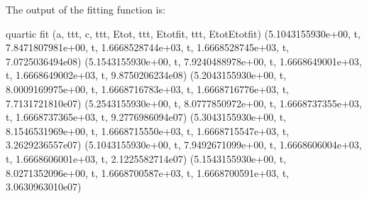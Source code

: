 \documentclass[letterpaper,10pt,english]{sphinxmanual}
\begin{document}
The output of the fitting function is:

\begin{sphinxVerbatim}[commandchars=\\\{\}]
quartic fit
(\PYGZsq{}a\PYGZsq{}, \PYGZsq{}\PYGZbs{}t\PYGZbs{}t\PYGZbs{}t\PYGZsq{}, \PYGZsq{}c\PYGZsq{}, \PYGZsq{}\PYGZbs{}t\PYGZbs{}t\PYGZbs{}t\PYGZsq{}, \PYGZsq{}Etot\PYGZsq{}, \PYGZsq{}\PYGZbs{}t\PYGZbs{}t\PYGZbs{}t\PYGZsq{}, \PYGZsq{}Etotfit\PYGZsq{}, \PYGZsq{}\PYGZbs{}t\PYGZbs{}t\PYGZbs{}t\PYGZsq{}, \PYGZsq{}Etot\PYGZhy{}Etotfit\PYGZsq{})
(\PYGZsq{}5.1043155930e+00\PYGZsq{}, \PYGZsq{}\PYGZbs{}t\PYGZsq{}, \PYGZsq{}7.8471807981e+00\PYGZsq{}, \PYGZsq{}\PYGZbs{}t\PYGZsq{}, \PYGZsq{}\PYGZhy{}1.6668528744e+03\PYGZsq{}, \PYGZsq{}\PYGZbs{}t\PYGZsq{}, \PYGZsq{}\PYGZhy{}1.6668528745e+03\PYGZsq{}, \PYGZsq{}\PYGZbs{}t\PYGZsq{}, \PYGZsq{}7.0725036494e\PYGZhy{}08\PYGZsq{})
(\PYGZsq{}5.1543155930e+00\PYGZsq{}, \PYGZsq{}\PYGZbs{}t\PYGZsq{}, \PYGZsq{}7.9240488978e+00\PYGZsq{}, \PYGZsq{}\PYGZbs{}t\PYGZsq{}, \PYGZsq{}\PYGZhy{}1.6668649001e+03\PYGZsq{}, \PYGZsq{}\PYGZbs{}t\PYGZsq{}, \PYGZsq{}\PYGZhy{}1.6668649002e+03\PYGZsq{}, \PYGZsq{}\PYGZbs{}t\PYGZsq{}, \PYGZsq{}9.8750206234e\PYGZhy{}08\PYGZsq{})
(\PYGZsq{}5.2043155930e+00\PYGZsq{}, \PYGZsq{}\PYGZbs{}t\PYGZsq{}, \PYGZsq{}8.0009169975e+00\PYGZsq{}, \PYGZsq{}\PYGZbs{}t\PYGZsq{}, \PYGZsq{}\PYGZhy{}1.6668716783e+03\PYGZsq{}, \PYGZsq{}\PYGZbs{}t\PYGZsq{}, \PYGZsq{}\PYGZhy{}1.6668716776e+03\PYGZsq{}, \PYGZsq{}\PYGZbs{}t\PYGZsq{}, \PYGZsq{}\PYGZhy{}7.7131721810e\PYGZhy{}07\PYGZsq{})
(\PYGZsq{}5.2543155930e+00\PYGZsq{}, \PYGZsq{}\PYGZbs{}t\PYGZsq{}, \PYGZsq{}8.0777850972e+00\PYGZsq{}, \PYGZsq{}\PYGZbs{}t\PYGZsq{}, \PYGZsq{}\PYGZhy{}1.6668737355e+03\PYGZsq{}, \PYGZsq{}\PYGZbs{}t\PYGZsq{}, \PYGZsq{}\PYGZhy{}1.6668737365e+03\PYGZsq{}, \PYGZsq{}\PYGZbs{}t\PYGZsq{}, \PYGZsq{}9.2776986094e\PYGZhy{}07\PYGZsq{})
(\PYGZsq{}5.3043155930e+00\PYGZsq{}, \PYGZsq{}\PYGZbs{}t\PYGZsq{}, \PYGZsq{}8.1546531969e+00\PYGZsq{}, \PYGZsq{}\PYGZbs{}t\PYGZsq{}, \PYGZsq{}\PYGZhy{}1.6668715550e+03\PYGZsq{}, \PYGZsq{}\PYGZbs{}t\PYGZsq{}, \PYGZsq{}\PYGZhy{}1.6668715547e+03\PYGZsq{}, \PYGZsq{}\PYGZbs{}t\PYGZsq{}, \PYGZsq{}\PYGZhy{}3.2629236557e\PYGZhy{}07\PYGZsq{})
(\PYGZsq{}5.1043155930e+00\PYGZsq{}, \PYGZsq{}\PYGZbs{}t\PYGZsq{}, \PYGZsq{}7.9492671099e+00\PYGZsq{}, \PYGZsq{}\PYGZbs{}t\PYGZsq{}, \PYGZsq{}\PYGZhy{}1.6668606004e+03\PYGZsq{}, \PYGZsq{}\PYGZbs{}t\PYGZsq{}, \PYGZsq{}\PYGZhy{}1.6668606001e+03\PYGZsq{}, \PYGZsq{}\PYGZbs{}t\PYGZsq{}, \PYGZsq{}\PYGZhy{}2.1225582714e\PYGZhy{}07\PYGZsq{})
(\PYGZsq{}5.1543155930e+00\PYGZsq{}, \PYGZsq{}\PYGZbs{}t\PYGZsq{}, \PYGZsq{}8.0271352096e+00\PYGZsq{}, \PYGZsq{}\PYGZbs{}t\PYGZsq{}, \PYGZsq{}\PYGZhy{}1.6668700587e+03\PYGZsq{}, \PYGZsq{}\PYGZbs{}t\PYGZsq{}, \PYGZsq{}\PYGZhy{}1.6668700591e+03\PYGZsq{}, \PYGZsq{}\PYGZbs{}t\PYGZsq{}, \PYGZsq{}3.0630963010e\PYGZhy{}07\PYGZsq{})

\end{sphinxVerbatim}
\end{document}
